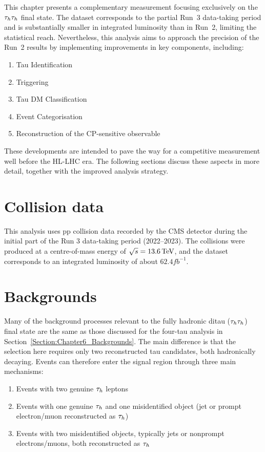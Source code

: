 This chapter presents a complementary measurement focusing exclusively on the $\tau_h \tau_h$ final state. The dataset corresponds to the partial Run~3 data-taking period and is substantially smaller in integrated luminosity than in Run~2, limiting the statistical reach. Nevertheless, this analysis aims to approach the precision of the Run~2 results by implementing improvements in key components, including:

\begin{enumerate}[label=(\roman*)]
    \item Tau Identification
    \item Triggering
    \item Tau \ac{DM} Classification
    \item Event Categorisation
    \item Reconstruction of the CP-sensitive observable
\end{enumerate}

These developments are intended to pave the way for a competitive measurement well before the \ac{HL}-\ac{LHC} era. The following sections discuss these aspects in more detail, together with the improved analysis strategy.


\section{Collision data}

This analysis uses pp collision data recorded by the \ac{CMS} detector during the initial part of the Run 3 data-taking period (2022–2023). The collisions were produced at a centre-of-mass energy of $\sqrt{s} = 13.6\,\text{Te\hspace{-.08em}V}$, and the dataset corresponds to an integrated luminosity of about $62.4\unit{fb}^{-1}$.

\section{Backgrounds}
\label{Section:Chapter7_Backgrounds}

Many of the background processes relevant to the fully hadronic ditau ($\tau_h\tau_h$) final state are the same as those discussed for the four-tau analysis in Section~\ref{Section:Chapter6_Backgrounds}. The main difference is that the selection here requires only two reconstructed tau candidates, both hadronically decaying. Events can therefore enter the signal region through three main mechanisms:  
\begin{enumerate}[label=(\roman*)]
    \item Events with two genuine $\tau_h$ leptons  
    \item Events with one genuine $\tau_h$ and one misidentified object (jet or prompt electron/muon reconstructed as $\tau_h$)  
    \item Events with two misidentified objects, typically jets or nonprompt electrons/muons, both reconstructed as $\tau_h$
\end{enumerate}

